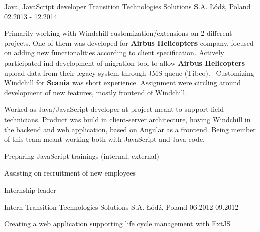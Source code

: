 \begin{cventries}
  \cventry
  {Java, JavaScript developer}
  {Transition Technologies Solutions S.A.}
  {Łódź, Poland}
  {02.2013 - 12.2014}
  {
      \begin{cvitems}
        \item{Primarily working with Windchill customization/extensions on 2 different projects.
            One of them was developed for \textbf{Airbus Helicopters} company, focused on
            adding new functionalities according to client specification.
            Actively participated ind development of migration tool to allow \textbf{Airbus Helicopters}
            upload data from their legacy system through JMS queue (Tibco). \
            Customizing Windchill for \textbf{Scania} was short experience. Assignment were circling
            around development of new features, mostly frontend of Windchill.
        }
        \item{Worked as Java/JavaScript developer at project meant to support field technicians.
            Product was build in client-server architecture, having Windchill in the backend and
            web application, based on Angular as a frontend. Being member of this team meant
            working both with JavaScript and Java code.
        }
        \item{Preparing JavaScript trainings (internal, external)}
        \item{Assisting on recruitment of new employees}
        \item{Internship leader}
      \end{cvitems}
  }

  \cventry
  {Intern}
  {Transition Technologies Solutions S.A.}
  {Łódź, Poland}
  {06.2012-09.2012}
  {
      \begin{cvitems}
          \item{Creating a web application supporting life cycle management with ExtJS}
      \end{cvitems}
  }

\end{cventries}
